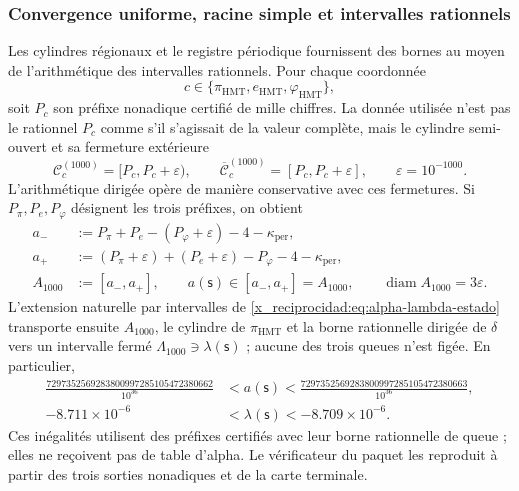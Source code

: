 \subsubsection{Convergence uniforme, racine simple et intervalles rationnels}
\label{x_reciprocidad:subsec:alpha-cotas-completas-rev08}

Les cylindres régionaux et le registre périodique fournissent des bornes au moyen
de l'arithmétique des intervalles rationnels. Pour chaque coordonnée
\[
 c\in\{\pi_{\mathrm{HMT}},e_{\mathrm{HMT}},\varphi_{\mathrm{HMT}}\},
\]
soit \(P_c\) son préfixe nonadique certifié de mille chiffres. La donnée utilisée
n'est pas le rationnel \(P_c\) comme s'il s'agissait de la valeur complète, mais le cylindre
semi-ouvert et sa fermeture extérieure
\[
 \mathcal C_c^{(1000)}=[P_c,P_c+\varepsilon),
 \qquad
 \overline{\mathcal C}_c^{(1000)}=[P_c,P_c+\varepsilon],
 \qquad \varepsilon=10^{-1000}.
\]
L'arithmétique dirigée opère de manière conservative avec ces fermetures. Si
\(P_\pi,P_e,P_\varphi\) désignent les trois préfixes, on obtient
\begin{equation}
\begin{aligned}
 a_-&:=P_\pi+P_e-(P_\varphi+\varepsilon)-4-
       \kappa_{\mathrm{per}},\\
 a_+&:=(P_\pi+\varepsilon)+(P_e+\varepsilon)-P_\varphi-4-
       \kappa_{\mathrm{per}},\\
 A_{1000}&:=[a_-,a_+],
 \qquad a(\mathsf s)\in[a_-,a_+]=A_{1000},
 \qquad \operatorname{diam}A_{1000}=3\varepsilon.
\end{aligned}
\label{x_reciprocidad:eq:alpha-propagacion-colas-rev08}
\end{equation}
L'extension naturelle par intervalles de
\eqref{x_reciprocidad:eq:alpha-lambda-estado} transporte ensuite \(A_{1000}\), le cylindre
de \(\pi_{\mathrm{HMT}}\) et la borne rationnelle dirigée de \(\delta\) vers un
intervalle fermé \(\Lambda_{1000}\ni\lambda(\mathsf s)\) ; aucune
des trois queues n'est figée. En particulier,
\begin{equation}
\begin{aligned}
 \frac{7297352569283800997285105472380662}{10^{36}}
 &<a(\mathsf s)<
 \frac{7297352569283800997285105472380663}{10^{36}},\\
 -8.711\mathbin{\times}10^{-6}
 &<\lambda(\mathsf s)<-8.709\mathbin{\times}10^{-6}.
\end{aligned}
 \label{x_reciprocidad:eq:alpha-cotas-precoordenada-lambda}
\end{equation}
Ces inégalités utilisent des préfixes certifiés avec leur borne rationnelle de
queue ; elles ne reçoivent pas de table d'alpha. Le vérificateur du paquet les reproduit
à partir des trois sorties nonadiques et de la carte terminale.

